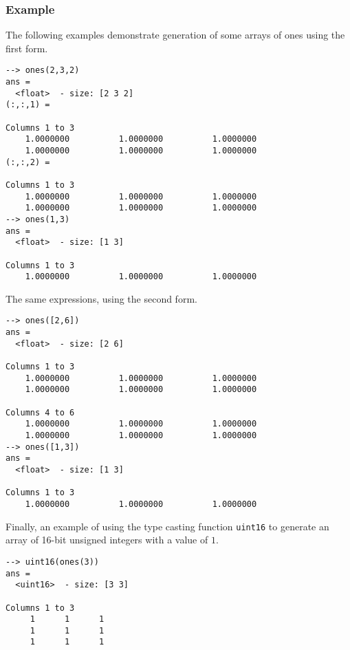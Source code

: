 \subsubsection{Example}
The following examples demonstrate generation of some arrays of ones
using the first form.
\begin{verbatim}
--> ones(2,3,2)
ans =
  <float>  - size: [2 3 2]
(:,:,1) =
  
Columns 1 to 3
    1.0000000          1.0000000          1.0000000
    1.0000000          1.0000000          1.0000000
(:,:,2) =
  
Columns 1 to 3
    1.0000000          1.0000000          1.0000000
    1.0000000          1.0000000          1.0000000
--> ones(1,3)
ans =
  <float>  - size: [1 3]
  
Columns 1 to 3
    1.0000000          1.0000000          1.0000000
\end{verbatim}
The same expressions, using the second form.
\begin{verbatim}
--> ones([2,6])
ans =
  <float>  - size: [2 6]
  
Columns 1 to 3
    1.0000000          1.0000000          1.0000000
    1.0000000          1.0000000          1.0000000
  
Columns 4 to 6
    1.0000000          1.0000000          1.0000000
    1.0000000          1.0000000          1.0000000
--> ones([1,3])
ans =
  <float>  - size: [1 3]
  
Columns 1 to 3
    1.0000000          1.0000000          1.0000000
\end{verbatim}
Finally, an example of using the type casting function \verb|uint16| to generate an array of 16-bit unsigned integers with a value of $1$.
\begin{verbatim}
--> uint16(ones(3))
ans =
  <uint16>  - size: [3 3]
  
Columns 1 to 3
     1      1      1
     1      1      1
     1      1      1
\end{verbatim}

